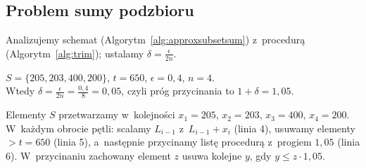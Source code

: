 \subsection{Problem sumy podzbioru}

Analizujemy schemat  (Algorytm~\ref{alg:approxsubsetsum}) z~procedurą  (Algorytm~\ref{alg:trim}); ustalamy $\delta = \frac{\epsilon}{2n}$.

\begin{example}
	$S = \{205, 203, 400, 200\}$, $t = 650$, $\epsilon = 0{,}4$, $n = 4$.\\
	Wtedy $\delta = \frac{\epsilon}{2n} = \frac{0{,}4}{8} = 0{,}05$, czyli próg przycinania to $1 + \delta = 1{,}05$.

	Elementy $S$ przetwarzamy w~kolejności $x_1 = 205$, $x_2 = 203$, $x_3 = 400$, $x_4 = 200$. W~każdym obrocie pętli: scalamy $L_{i-1}$ z~$L_{i-1} + x_i$ (linia 4), usuwamy elementy $> t = 650$ (linia 5), a~następnie przycinamy listę procedurą  z~progiem $1{,}05$ (linia 6). W~przycinaniu zachowany element $z$ usuwa kolejne $y$, gdy $y \leq z \cdot 1{,}05$.


\end{example}
